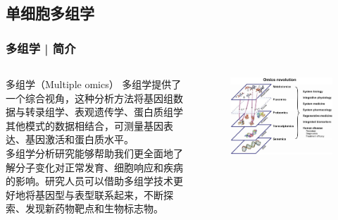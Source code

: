 \documentclass[11pt]{ctexbeamer}
\begin{document}
\subsection{单细胞多组学}
\begin{frame}
	\frametitle{多组学 | 简介}
	\begin{columns}
		\begin{block}{多组学（Multiple omics）}	
			多组学提供了一个综合视角，这种分析方法将基因组数据与转录组学、表观遗传学、蛋白质组学其他模式的数据相结合，可测量基因表达、基因激活和蛋白质水平。\\ \vspace{0.4em}
			多组学分析研究能够帮助我们更全面地了解分子变化对正常发育、细胞响应和疾病的影响。研究人员可以借助多组学技术更好地将基因型与表型联系起来，不断探索、发现新药物靶点和生物标志物。
		\end{block}
		\begin{figure}
		\includegraphics[width=\textwidth]{omics_05.png}
	\end{figure}
	\end{columns}
\end{frame}
\end{document}
